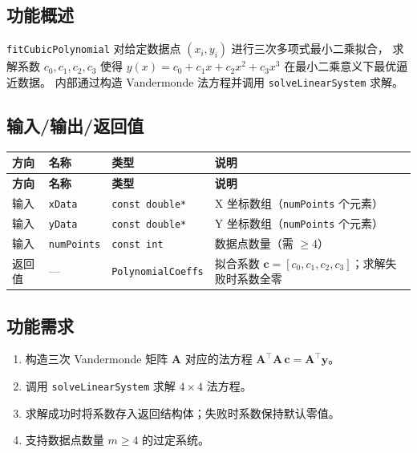 \documentclass[a4paper,10pt]{article}
\begin{document}
\subsection{功能概述}

\texttt{fitCubicPolynomial} 对给定数据点 $(x_i, y_i)$ 进行三次多项式最小二乘拟合，
求解系数 $c_0, c_1, c_2, c_3$ 使得
$y(x) = c_0 + c_1 x + c_2 x^2 + c_3 x^3$
在最小二乘意义下最优逼近数据。
内部通过构造 Vandermonde 法方程并调用 \texttt{solveLinearSystem} 求解。

\subsection{输入/输出/返回值}

\renewcommand{\arraystretch}{1.3}
\begin{longtable}{|L{2.2cm}|L{3cm}|C{2.5cm}|L{7cm}|}
\hline
\textbf{方向} & \textbf{名称} & \textbf{类型} & \textbf{说明} \\
\hline
\endfirsthead
\hline
\textbf{方向} & \textbf{名称} & \textbf{类型} & \textbf{说明} \\
\hline
\endhead
输入 & \texttt{xData} & \texttt{const double*} & X 坐标数组（\texttt{numPoints} 个元素） \\
\hline
输入 & \texttt{yData} & \texttt{const double*} & Y 坐标数组（\texttt{numPoints} 个元素） \\
\hline
输入 & \texttt{numPoints} & \texttt{const int} & 数据点数量（需 $\geq 4$） \\
\hline
返回值 & --- & \texttt{PolynomialCoeffs} & 拟合系数 $\mathbf{c} = [c_0, c_1, c_2, c_3]$；求解失败时系数全零 \\
\hline
\end{longtable}

\subsection{功能需求}

\begin{enumerate}[label=FR-\arabic*]
  \item 构造三次 Vandermonde 矩阵 $\mathbf{A}$ 对应的法方程 $\mathbf{A}^{\!\top}\!\mathbf{A}\,\mathbf{c} = \mathbf{A}^{\!\top}\!\mathbf{y}$。
  \item 调用 \texttt{solveLinearSystem} 求解 $4 \times 4$ 法方程。
  \item 求解成功时将系数存入返回结构体；失败时系数保持默认零值。
  \item 支持数据点数量 $m \geq 4$ 的过定系统。
\end{enumerate}
\end{document}
